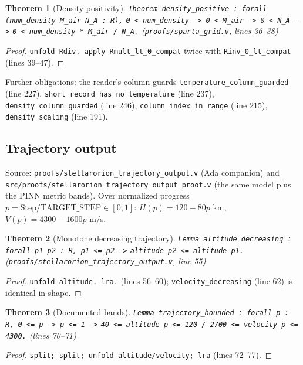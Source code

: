 \documentclass[11pt]{article}
\newtheorem{theorem}{Theorem}
\theoremstyle{definition}
\begin{document}
\begin{theorem}[Density positivity]\label{thm:density}
\texttt{Theorem density\_positive : forall (num\_density M\_air N\_A : R),}
\texttt{0 < num\_density -> 0 < M\_air -> 0 < N\_A ->}
\texttt{0 < num\_density * M\_air / N\_A.}
(\texttt{proofs/sparta\_grid.v}, lines 36--38)
\end{theorem}
\begin{proof}
\verb|unfold Rdiv. apply Rmult_lt_0_compat| twice with
\verb|Rinv_0_lt_compat| (lines 39--47).
\end{proof}

Further obligations: the reader's column guards
\texttt{temperature\_column\_guarded} (line 227),
\texttt{short\_record\_has\_no\_temperature} (line 237),
\texttt{density\_column\_guarded} (line 246),
\texttt{column\_index\_in\_range} (line 215),
\texttt{density\_scaling} (line 191).

\subsection{Trajectory output}\label{sec:traj}

Source: \texttt{proofs/stellarorion\_trajectory\_output.v} (Ada companion)
and \texttt{src/proofs/stellarorion\_trajectory\_output\_proof.v} (the same
model plus the PINN metric bands). Over normalized progress
$p = \mathrm{Step}/\mathrm{TARGET\_STEP} \in [0,1]$:
$H(p) = 120 - 80p$ km, $V(p) = 4300 - 1600p$ m/s.

\begin{theorem}[Monotone decreasing trajectory]\label{thm:traj-mono}
\texttt{Lemma altitude\_decreasing : forall p1 p2 : R, p1 <= p2 ->}
\texttt{altitude p2 <= altitude p1.}
(\texttt{proofs/stellarorion\_trajectory\_output.v}, line 55)
\end{theorem}
\begin{proof}
\verb|unfold altitude. lra.| (lines 56--60); \texttt{velocity\_decreasing}
(line 62) is identical in shape.
\end{proof}

\begin{theorem}[Documented bands]\label{thm:traj-band}
\texttt{Lemma trajectory\_bounded : forall p : R, 0 <= p -> p <= 1 ->}
\texttt{40 <= altitude p <= 120 /\ 2700 <= velocity p <= 4300.}
(lines 70--71)
\end{theorem}
\begin{proof}
\verb|split; split; unfold altitude/velocity; lra| (lines 72--77).
\end{proof}
\end{document}
